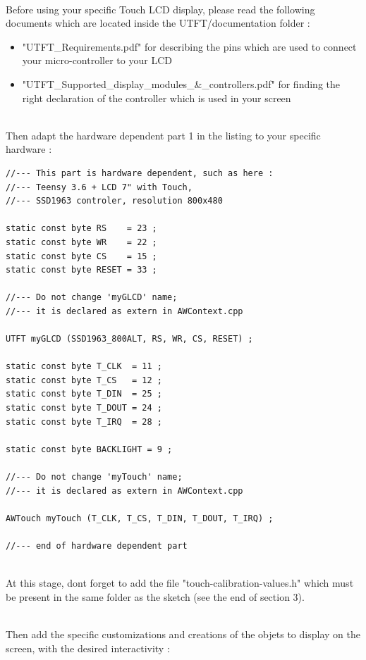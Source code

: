 \documentclass[a4paper,11pt]{extarticle}
\begin{document}
~\\Before using your specific Touch LCD display, please read the following documents which are located inside the UTFT/documentation folder :

\begin{itemize}
\item  "UTFT\_Requirements.pdf" for describing the pins which are used to connect your micro-controller to your LCD 
 \item "UTFT\_Supported\_display\_modules\_\&\_controllers.pdf" for finding the right declaration of the controller which is used in your screen 
\end{itemize}

~\\Then adapt the hardware dependent part 1 in the listing to your specific hardware :
 
 \begin{lstlisting}[language=Arduinonl]
//--- This part is hardware dependent, such as here :
//--- Teensy 3.6 + LCD 7" with Touch, 
//--- SSD1963 controler, resolution 800x480

static const byte RS    = 23 ;
static const byte WR    = 22 ;
static const byte CS    = 15 ;
static const byte RESET = 33 ;

//--- Do not change 'myGLCD' name; 
//--- it is declared as extern in AWContext.cpp

UTFT myGLCD (SSD1963_800ALT, RS, WR, CS, RESET) ;

static const byte T_CLK  = 11 ;
static const byte T_CS   = 12 ;
static const byte T_DIN  = 25 ;
static const byte T_DOUT = 24 ;
static const byte T_IRQ  = 28 ;

static const byte BACKLIGHT = 9 ;

//--- Do not change 'myTouch' name; 
//--- it is declared as extern in AWContext.cpp

AWTouch myTouch (T_CLK, T_CS, T_DIN, T_DOUT, T_IRQ) ;

//--- end of hardware dependent part  
\end{lstlisting}

~\\ At this stage, dont forget to add the file "touch-calibration-values.h" which must be present in the same folder as the sketch (see the end of section 3).
  
~\\Then add the specific customizations and creations of the objets to display on the screen, with the desired interactivity :
\end{document}
